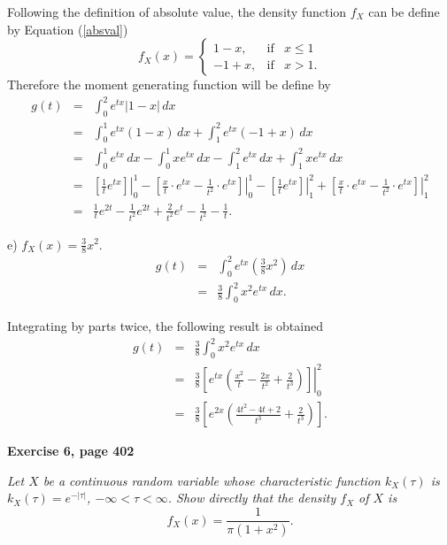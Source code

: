 \documentclass[12pt]{article}
\begin{document}
	Following the definition of absolute value, the density function $f_X$ can be define by Equation (\ref{absval})
	\begin{equation}
	f_X(x)= \left\{ \begin{array}{lcc}
	1-x, &   \text{if}  & x \leq 1 \\
	-1+x, &  \text{if}  & x > 1.
	\end{array}
	\right.
	\label{absval}
	\end{equation}
	Therefore the moment generating function will be define by %
	\begin{eqnarray*}
		g(t) &=& \int_{0}^{2} e^{tx} |1 - x|\, dx \\
		&=& \int_{0}^{1} e^{tx}(1-x) \, dx + \int_{1}^{2} e^{tx} (-1+x) \, dx \\
		&=& \int_{0}^{1} e^{tx} \, dx - \int_{0}^{1} xe^{tx}\, dx -  \int_{1}^{2} e^{tx} \, dx + \int_{1}^{2} xe^{tx}\, dx \\
		&=& \left. \left[\frac{1}{t} e^{tx}\right] \right|_{0}^{1} - \left. \left[ \frac{x}{t} \cdot e^{tx} - \frac{1}{t^2} \cdot e^{tx}\right] \right|_{0}^{1} - \left. \left[\frac{1}{t} e^{tx}\right] \right|_{1}^{2} + \left. \left[ \frac{x}{t} \cdot e^{tx} - \frac{1}{t^2} \cdot e^{tx}\right] \right|_{1}^{2} \\
		&=& \frac{1}{t} e^{2t} - \frac{1}{t^2}e^{2t} + \frac{2}{t^2} e^t - \frac{1}{t^2} - \frac{1}{t}. 
	\end{eqnarray*}
	
	\noindent e) $f_X (x) = \frac{3}{8}x^2$.  
	\begin{eqnarray*}
		g(t) &=& \int_{0}^{2} e^{tx} \left(\frac{3}{8}x^2 \right)\, dx \\
		&=& \frac{3}{8} \int_{0}^{2} x^2e^{tx} \, dx.
	\end{eqnarray*}

	Integrating by parts twice, the following result is obtained
	\begin{eqnarray*}
		g(t) &=& \frac{3}{8} \int_{0}^{2} x^2e^{tx} \, dx\\
		&=& \frac{3}{8} \left. \left[e^{tx} \left( \frac{x^2}{t} - \frac{2x}{t^2} + \frac{2}{t^3}\right)\right] \right|_0^2 \\
		&=& \frac{3}{8} \left[e^{2x} \left( \frac{4t^2-4t+2}{t^3} + \frac{2}{t^3}\right)\right].
	\end{eqnarray*}

	{\bf Exercise 6, page 402}
	
	{\em Let $X$ be a continuous random variable whose characteristic function $k_X (\tau)$ is $k_X(\tau) = e^{-|\tau|}$, $-\infty < \tau < \infty$. Show directly that the density $f_X$ of $X$ is
	\begin{equation*}
		f_X(x) = \frac{1}{\pi (1+x^2)}.
	\end{equation*}
	}
\end{document}
